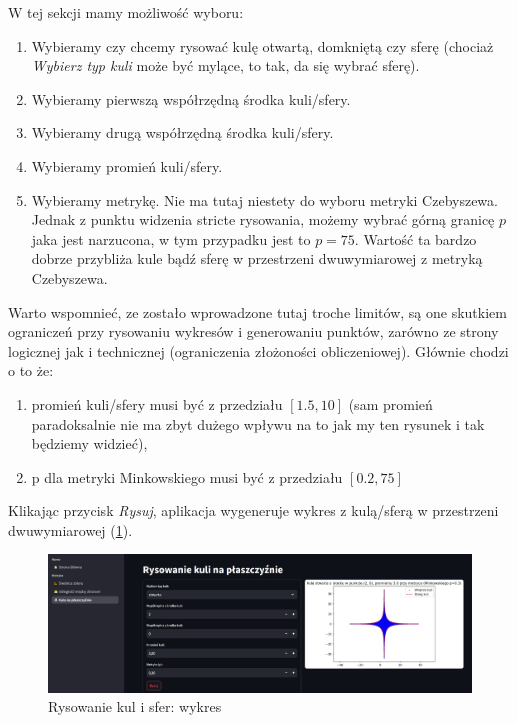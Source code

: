 \documentclass[article,11pt]{mwrep}
\begin{document}
W tej sekcji mamy możliwość wyboru:
\begin{enumerate}
    \item Wybieramy czy chcemy rysować kulę otwartą, domkniętą czy sferę (chociaż \textit{Wybierz typ kuli} może być mylące, to tak, da się wybrać sferę).
    \item Wybieramy pierwszą współrzędną środka kuli/sfery.
    \item Wybieramy drugą współrzędną środka kuli/sfery.
    \item Wybieramy promień kuli/sfery. 
    \item Wybieramy metrykę. Nie ma tutaj niestety do wyboru metryki Czebyszewa. Jednak z punktu widzenia stricte rysowania, możemy wybrać górną granicę $p$ jaka jest narzucona, w tym przypadku jest to $p=75$. Wartość ta bardzo dobrze przybliża kule bądź sferę w przestrzeni dwuwymiarowej z metryką Czebyszewa. 
\end{enumerate}

Warto wspomnieć, ze zostało wprowadzone tutaj troche limitów, są one skutkiem ograniczeń przy rysowaniu wykresów i generowaniu punktów, zarówno ze strony logicznej jak i technicznej (ograniczenia złożoności obliczeniowej). Głównie chodzi o to że:
\begin{enumerate}
    \item promień kuli/sfery musi być z przedziału $[1.5, 10]$ (sam promień paradoksalnie nie ma zbyt dużego wpływu na to jak my ten rysunek i tak będziemy widzieć),
    \item p dla metryki Minkowskiego musi być z przedziału $[0.2, 75]$ 
\end{enumerate}

Klikając przycisk \textit{Rysuj}, aplikacja wygeneruje wykres z kulą/sferą w przestrzeni dwuwymiarowej (\ref{rys:rw}). 

\begin{figure}[H] 
    \centering
    \includegraphics[width=1\textwidth]{figure/Screenshot_9.jpg}
    \caption{Rysowanie kul i sfer: wykres}\label{rys:rw}
\end{figure}
\end{document}
